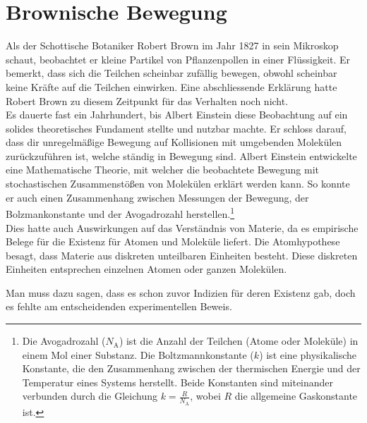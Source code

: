 %
%
%
%
\section{Brownische Bewegung\label{brown:section:teil0}}

Als der Schottische Botaniker Robert Brown im Jahr 1827 in sein Mikroskop schaut, beobachtet er kleine Partikel von Pflanzenpollen in einer Flüssigkeit. Er bemerkt, dass sich die Teilchen scheinbar zufällig bewegen, obwohl scheinbar keine Kräfte auf die Teilchen einwirken. Eine abschliessende Erklärung hatte Robert Brown zu diesem Zeitpunkt für das Verhalten noch nicht.\\



Es dauerte fast ein Jahrhundert, bis Albert Einstein diese Beobachtung auf ein solides theoretisches Fundament stellte und nutzbar machte. Er schloss darauf, dass dir unregelmäßige Bewegung auf Kollisionen mit umgebenden Molekülen zurückzuführen ist, welche ständig in Bewegung sind. Albert Einstein entwickelte eine Mathematische Theorie, mit welcher die beobachtete Bewegung mit stochastischen Zusammenstößen von Molekülen erklärt werden kann. So konnte er auch einen Zusammenhang zwischen Messungen der Bewegung, der Bolzmankonstante und der  Avogadrozahl herstellen.\footnote{Die Avogadrozahl ($N_\mathrm{A}$) ist die Anzahl der Teilchen (Atome oder Moleküle) in einem Mol einer Substanz. Die Boltzmannkonstante ($k$) ist eine physikalische Konstante, die den Zusammenhang zwischen der thermischen Energie und der Temperatur eines Systems herstellt. Beide Konstanten sind miteinander verbunden durch die Gleichung $k = \frac{R}{N_\mathrm{A}}$, wobei $R$ die allgemeine Gaskonstante ist.}\\


Dies hatte auch Auswirkungen auf das Verständnis von Materie, da es empirische Belege für die Existenz für Atomen und Moleküle liefert. Die Atomhypothese besagt, dass Materie aus diskreten unteilbaren Einheiten besteht. Diese diskreten Einheiten entsprechen einzelnen Atomen oder ganzen Molekülen. 

Man muss dazu sagen, dass es schon zuvor Indizien für deren Existenz gab, doch es fehlte am entscheidenden experimentellen Beweis.\\


